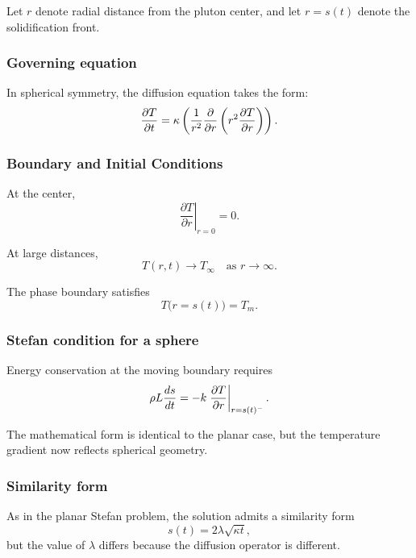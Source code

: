 Let $r$ denote radial distance from the pluton center, and let $r = s(t)$ denote the solidification front.

\subsubsection*{Governing equation}

In spherical symmetry, the diffusion equation takes the form:
\begin{equation}
    \frac{\partial T}{\partial t} =
    \kappa \left( \frac{1}{r^2}\pdv{}{r} \left( r^2 \pdv{T}{r} \right) \right).
\end{equation}

\subsubsection*{Boundary and Initial Conditions}

At the center,
\begin{equation}
\left.\frac{\partial T}{\partial r}\right|_{r=0} = 0.
\end{equation}

At large distances,
\begin{equation}
T(r,t) \rightarrow T_\infty \quad \text{as } r \rightarrow \infty.
\end{equation}

The phase boundary satisfies
\begin{equation}
T\bigl(r = s(t)\bigr) = T_m.
\end{equation}

\subsubsection*{Stefan condition for a sphere}

Energy conservation at the moving boundary requires
\begin{equation}
\rho L \frac{ds}{dt} = - k \eval{ \pdv{T}{r} }_{r=s(t)^-}.
\end{equation}

The mathematical form is identical to the planar case, but the temperature gradient
now reflects spherical geometry.

\subsubsection*{Similarity form}

As in the planar Stefan problem, the solution admits a similarity form
\begin{equation}
s(t) = 2 \lambda \sqrt{\kappa t},
\end{equation}
but the value of $\lambda$ differs because the diffusion operator is different.

